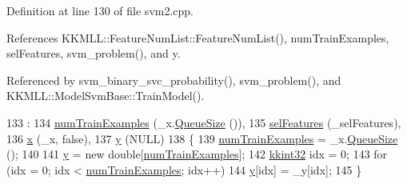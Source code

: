Definition at line 130 of file svm2.\+cpp.



References K\+K\+M\+L\+L\+::\+Feature\+Num\+List\+::\+Feature\+Num\+List(), num\+Train\+Examples, sel\+Features, svm\+\_\+problem(), and y.



Referenced by svm\+\_\+binary\+\_\+svc\+\_\+probability(), svm\+\_\+problem(), and K\+K\+M\+L\+L\+::\+Model\+Svm\+Base\+::\+Train\+Model().


\begin{DoxyCode}
133                                       :
134   \hyperlink{struct_s_v_m289___m_f_s_1_1svm__problem_a16d137e053c79776e064691a20fa80ee}{numTrainExamples} (\_x.\hyperlink{class_k_k_b_1_1_k_k_queue_a1dab601f75ee6a65d97f02bddf71c40d}{QueueSize} ()),
135   \hyperlink{struct_s_v_m289___m_f_s_1_1svm__problem_acb97fd041d0a35f90ce7e4a906ae2a17}{selFeatures}      (\_selFeatures), 
136   \hyperlink{struct_s_v_m289___m_f_s_1_1svm__problem_a7bca932b51ca89f6820225e8e9c1bd35}{x}                (\_x, \textcolor{keyword}{false}),
137   \hyperlink{struct_s_v_m289___m_f_s_1_1svm__problem_a56cf75f3e15322e1928a8294f9a55d2a}{y}                (NULL)
138 \{
139   \hyperlink{struct_s_v_m289___m_f_s_1_1svm__problem_a16d137e053c79776e064691a20fa80ee}{numTrainExamples} = \_x.\hyperlink{class_k_k_b_1_1_k_k_queue_a1dab601f75ee6a65d97f02bddf71c40d}{QueueSize} ();
140 
141   \hyperlink{struct_s_v_m289___m_f_s_1_1svm__problem_a56cf75f3e15322e1928a8294f9a55d2a}{y} = \textcolor{keyword}{new} \textcolor{keywordtype}{double}[\hyperlink{struct_s_v_m289___m_f_s_1_1svm__problem_a16d137e053c79776e064691a20fa80ee}{numTrainExamples}];
142   \hyperlink{namespace_k_k_b_a8fa4952cc84fda1de4bec1fbdd8d5b1b}{kkint32}  idx = 0;
143   \textcolor{keywordflow}{for}  (idx = 0;  idx < \hyperlink{struct_s_v_m289___m_f_s_1_1svm__problem_a16d137e053c79776e064691a20fa80ee}{numTrainExamples};  idx++)
144     \hyperlink{struct_s_v_m289___m_f_s_1_1svm__problem_a56cf75f3e15322e1928a8294f9a55d2a}{y}[idx] = \_y[idx];
145 \}
\end{DoxyCode}
